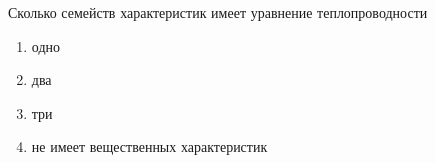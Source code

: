 Сколько семейств характеристик имеет уравнение теплопроводности

\begin{enumerate}[label=\arabic*)]
    \item одно
    \item два
    \item три
    \item не имеет вещественных характеристик
\end{enumerate}

